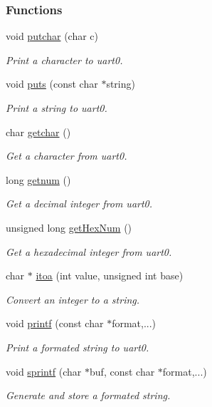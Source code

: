 \subsubsection*{Functions}
\begin{DoxyCompactItemize}
\item 
void \mbox{\hyperlink{a00026_a948b7a0779c308ac5502c57e282e6933}{putchar}} (char c)
\begin{DoxyCompactList}\small\item\em Print a character to uart0. \end{DoxyCompactList}\item 
void \mbox{\hyperlink{a00026_a46036bd75b920766eef64eb7910c887d}{puts}} (const char $\ast$string)
\begin{DoxyCompactList}\small\item\em Print a string to uart0. \end{DoxyCompactList}\item 
char \mbox{\hyperlink{a00026_a0979671914792955a7a68461634ff82d}{getchar}} ()
\begin{DoxyCompactList}\small\item\em Get a character from uart0. \end{DoxyCompactList}\item 
long \mbox{\hyperlink{a00026_a46d9f17d80612d1174eab96f53c7c5b7}{getnum}} ()
\begin{DoxyCompactList}\small\item\em Get a decimal integer from uart0. \end{DoxyCompactList}\item 
unsigned long \mbox{\hyperlink{a00026_af48103646b7cb053e55eb3867a05fc85}{get\+Hex\+Num}} ()
\begin{DoxyCompactList}\small\item\em Get a hexadecimal integer from uart0. \end{DoxyCompactList}\item 
char $\ast$ \mbox{\hyperlink{a00026_ac399b37e5355c704e130b1c6f60b71ec}{itoa}} (int value, unsigned int base)
\begin{DoxyCompactList}\small\item\em Convert an integer to a string. \end{DoxyCompactList}\item 
void \mbox{\hyperlink{a00026_a133c04c35a1c14c6f8d8078831705661}{printf}} (const char $\ast$format,...)
\begin{DoxyCompactList}\small\item\em Print a formated string to uart0. \end{DoxyCompactList}\item 
void \mbox{\hyperlink{a00026_ab416b2a62f47ec0095853e37ba84e78b}{sprintf}} (char $\ast$buf, const char $\ast$format,...)
\begin{DoxyCompactList}\small\item\em Generate and store a formated string. \end{DoxyCompactList}\end{DoxyCompactItemize}


